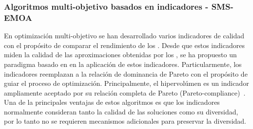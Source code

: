 \subsubsection{Algoritmos multi-objetivo basados en indicadores - SMS-EMOA}

En optimización multi-objetivo se han desarrollado varios indicadores de calidad con el propósito de comparar el rendimiento de los \MOEAS{}.
%
Desde que estos indicadores miden la calidad de las aproximaciones obtenidas por los \MOEAS{}, se ha propuesto un paradigma basado en en la aplicación de estos indicadores.
%
Particularmente, los indicadores reemplazan a la relación de dominancia de Pareto con el propósito de guiar el proceso de optimización.
%
Principalmente, el hipervolúmen es un indicador ampliamente aceptado por su relación completa de Pareto (Pareto-compliance)~\cite{Joel:IGDPlus_And_GDPlus}.
%
Una de la principales ventajas de estos algoritmos es que los indicadores normalmente consideran tanto la calidad de las soluciones como su diversidad, por lo tanto no se requieren mecanismos adicionales para preservar la diversidad.
%

